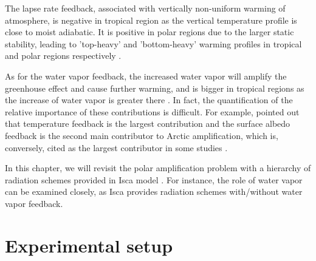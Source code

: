 The lapse rate feedback, associated with vertically non-uniform warming of atmosphere, is negative in tropical region as the vertical temperature profile is close to moist adiabatic. It is positive in polar regions due to the larger static stability, leading to 'top-heavy' and 'bottom-heavy' warming profiles in tropical and polar regions respectively \citep{Graversen2009, Pithan2014, Manabe1975, Kim2018}.

As for the water vapor feedback, the increased water vapor will amplify the greenhouse effect and cause further warming, and is bigger in tropical regions as the increase of water vapor is greater there \citep{Taylor2013, Pithan2014}. In fact, the quantification of the relative importance of these contributions is difficult. For example, \cite{Pithan2014} pointed out that temperature feedback is the largest contribution and the surface albedo feedback is the second main contributor to Arctic amplification, which is, conversely, cited as the largest contributor in some studies \citep[e.g.,][]{Manabe1975,Winton2006amplified,Hall2004}.


In this chapter, we will revisit the polar amplification problem with a hierarchy of radiation schemes provided in Isca model \citep{Vallis2018}. For instance, the role of water vapor can be examined closely, as Isca  provides radiation schemes with/without water vapor feedback.


\section{Experimental setup}
\label{sec:setup}

